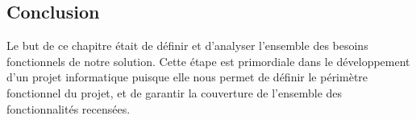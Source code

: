 \subsection{Conclusion}
Le but de ce chapitre était de définir et d’analyser l’ensemble des besoins fonctionnels  de notre solution. Cette étape est primordiale dans le développement d’un projet informatique puisque elle nous permet de définir le périmètre fonctionnel du projet, et de garantir la couverture de l’ensemble des fonctionnalités recensées.
